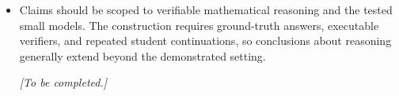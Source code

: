 \documentclass[11pt,a4paper]{article}
\begin{document}
\begin{itemize}
\item Claims should be scoped to verifiable mathematical reasoning and the tested small models. The construction requires ground-truth answers, executable verifiers, and repeated student continuations, so conclusions about reasoning generally extend beyond the demonstrated setting.
\par{}
\begin{responsebox}[frametitle={Response to S4},nobreak=true]
\textit{[To be completed.]}\par\vspace{1em}
\end{responsebox}

\end{itemize}
\end{document}

